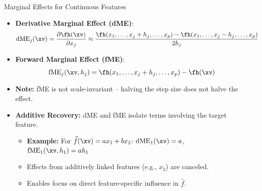 \documentclass[11pt,compress,t,notes=noshow, aspectratio=169, xcolor=table]{beamer}
\begin{document}
\begin{frame}{Marginal Effects for Continuous Features}
\begin{itemize}
\item \textbf{Derivative Marginal Effect (dME)}:
\[
\text{dME}_j(\xv) = \frac{\partial \fh(\xv)}{\partial x_j} \approx \frac{ \fh(x_1, \dots, x_j + h_j, \dots, x_p) -  \fh(x_1, \dots, x_j - h_j, \dots, x_p)}{2h_j}
\]
\item \textbf{Forward Marginal Effect (fME)}:
\[
\text{fME}_j(\xv, h_j) = \fh(x_1, \dots, x_j + h_j, \dots, x_p) - \fh(\xv)
\]

\end{itemize}
\begin{itemize}
\item \textbf{Note:} fME is not scale-invariant -- halving the step size does not halve the effect.


\item \textbf{Additive Recovery:} dME and fME isolate terms involving the target feature.
\begin{itemize}
\item \textbf{Example:} For $\widehat{f}(\xv) = a x_1 + b x_2$: 
$\text{dME}_1(\xv) = a$, \quad $\text{fME}_1(\xv, h_1) = a h_1$
\item Effects from additively linked features (e.g., $x_2$) are canceled.
\item Enables focus on direct feature-specific influence in $\widehat{f}$.
\end{itemize}

\end{itemize}

\end{frame}
\end{document}
